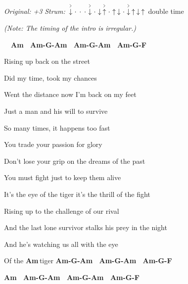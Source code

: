 \begin{song}


\begin{headerbox}
\RaiseBoxWithAccents
\textit{Original: +3} \quad
\textit{Strum:} $\AccentDown\Miss\Miss\Miss\AccentDown\Miss\Down\AccentUp \Miss\Up\Down\Miss\AccentDown\Up\Down\Up$ double time
\end{headerbox}

\begin{hchordbox}
\end{hchordbox}

\Large


\bigskip

{
\it \smaller (Note: The timing of the intro is irregular.)
}

\bigskip

\Intro\ \  
\textbf{Am \ Am-G-Am \ Am-G-Am \ Am-G-F \ }  \par

\bigskip

 Rising up back on the street \par
{} Did my time, took my chances \par
{} Went the distance now I’m back on my feet \par
Just a \ch{G}man and his will to sur\ch{Am}vive \par

\bigskip

 So many times, it happens too fast \par
{} You trade your passion for glory \par
{} Don’t lose your grip on the dreams of the past \par
You must \ch{G}fight just to keep them a\ch{Am}live \par

\bigskip

\begin{chorusboxwide}{\Chorus}
It’s the  eye of the tiger it’s the thrill of the fight \par
Rising up to the challenge of our \ch{C\beat}ri\ch{G\beats3}val \par
And the \ch{Dm}last lone survivor stalks his prey in the night \par
And he’s \ch{Dm\beats2}watching us \ch{C\beats2}all with the \ch{F\rep2}eye \par
Of the \textbf{Am\,}tiger \textbf{Am-G-Am \ Am-G-Am \ Am-G-F \ } \par
\textbf{Am \ Am-G-Am \ Am-G-Am \ Am-G-F \ } \par
\end{chorusboxwide}


\end{song}
